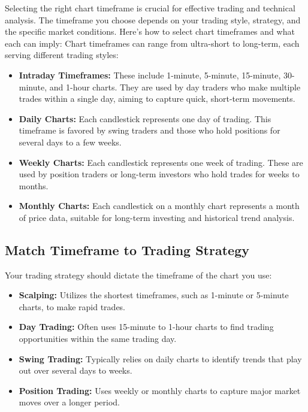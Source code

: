 \documentclass{report}
\begin{document}
     \pagebreak 
     \bigbreak \noindent 
     Selecting the right chart timeframe is crucial for effective trading and technical analysis. The timeframe you choose depends on your trading style, strategy, and the specific market conditions. Here’s how to select chart timeframes and what each can imply:
     \bigbreak \noindent 
     Chart timeframes can range from ultra-short to long-term, each serving different trading styles:
     \begin{itemize}
         \item \textbf{Intraday Timeframes:} These include 1-minute, 5-minute, 15-minute, 30-minute, and 1-hour charts. They are used by day traders who make multiple trades within a single day, aiming to capture quick, short-term movements.
         \item \textbf{Daily Charts:} Each candlestick represents one day of trading. This timeframe is favored by swing traders and those who hold positions for several days to a few weeks.
         \item \textbf{Weekly Charts:} Each candlestick represents one week of trading. These are used by position traders or long-term investors who hold trades for weeks to months.
         \item \textbf{Monthly Charts:} Each candlestick on a monthly chart represents a month of price data, suitable for long-term investing and historical trend analysis.
     \end{itemize}

     \bigbreak \noindent 
     \subsection{Match Timeframe to Trading Strategy}
     \bigbreak \noindent 
     Your trading strategy should dictate the timeframe of the chart you use:
     \begin{itemize}
         \item \textbf{Scalping:} Utilizes the shortest timeframes, such as 1-minute or 5-minute charts, to make rapid trades.
         \item \textbf{Day Trading:} Often uses 15-minute to 1-hour charts to find trading opportunities within the same trading day.
         \item \textbf{Swing Trading:} Typically relies on daily charts to identify trends that play out over several days to weeks.
         \item \textbf{Position Trading:} Uses weekly or monthly charts to capture major market moves over a longer period.
     \end{itemize}
\end{document}
